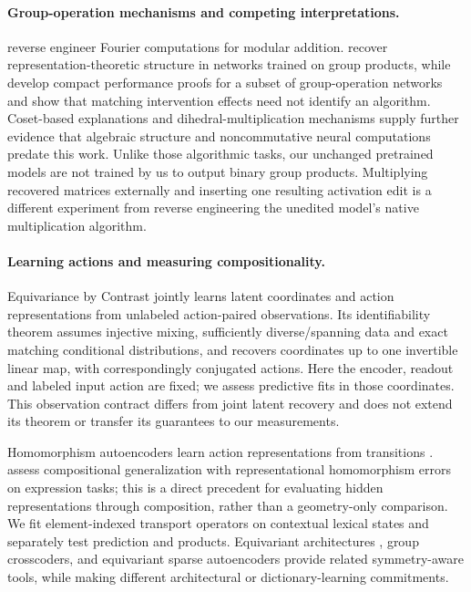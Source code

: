 \paragraph{Group-operation mechanisms and competing interpretations.}
\citet{nanda2023progress} reverse engineer Fourier computations for modular addition. \citet{chughtai2023toy} recover representation-theoretic structure in networks trained on group products, while \citet{wu2025unified} develop compact performance proofs for a subset of group-operation networks and show that matching intervention effects need not identify an algorithm. Coset-based explanations \citep{stander2024cosets} and dihedral-multiplication mechanisms \citep{wei2026dihedral} supply further evidence that algebraic structure and noncommutative neural computations predate this work. Unlike those algorithmic tasks, our unchanged pretrained models are not trained by us to output binary group products. Multiplying recovered matrices externally and inserting one resulting activation edit is a different experiment from reverse engineering the unedited model's native multiplication algorithm.

\paragraph{Learning actions and measuring compositionality.}
Equivariance by Contrast \citep{schmidt2025equivariance} jointly learns latent coordinates and action representations from unlabeled action-paired observations. Its identifiability theorem assumes injective mixing, sufficiently diverse/spanning data and exact matching conditional distributions, and recovers coordinates up to one invertible linear map, with correspondingly conjugated actions. Here the encoder, readout and labeled input action are fixed; we assess predictive fits in those coordinates. This observation contract differs from joint latent recovery and does not extend its theorem or transfer its guarantees to our measurements.

Homomorphism autoencoders learn action representations from transitions \citep{keurti2023homomorphism}. \citet{an2026homomorphism} assess compositional generalization with representational homomorphism errors on expression tasks; this is a direct precedent for evaluating hidden representations through composition, rather than a geometry-only comparison. We fit element-indexed transport operators on contextual lexical states and separately test prediction and products. Equivariant architectures \citep{cohen2016group,kondor2018generalization,weiler2019general}, group crosscoders, and equivariant sparse autoencoders \citep{gorton2024group,erdogan2025group} provide related symmetry-aware tools, while making different architectural or dictionary-learning commitments.

